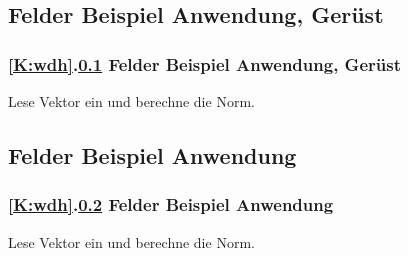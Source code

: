 \def\stitle{Felder Beispiel Anwendung, Ger\"ust}
\subsection{\stitle}\label{S:BeispielG}
\begin{frame}[t]%
  \frametitle{\ref{K:wdh}.\ref{S:BeispielG} \stitle}
\medskip

Lese Vektor ein und berechne die Norm.


\end{frame}


\def\stitle{Felder Beispiel Anwendung}
\subsection{\stitle}\label{S:Beispiel}
\begin{frame}[t]%
  \frametitle{\ref{K:wdh}.\ref{S:Beispiel} \stitle}
\medskip

Lese Vektor ein und berechne die Norm.


\end{frame}
